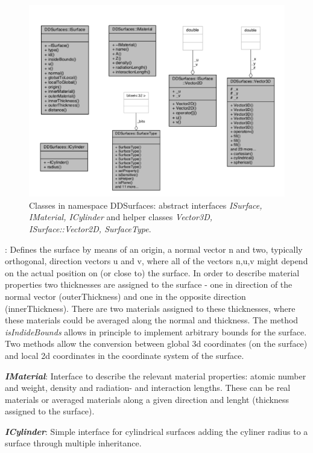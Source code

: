 \documentclass[10pt,a4paper]{article}
\begin{document}
\begin{figure}[h]
  \begin{center}
    \includegraphics[width=120mm] {DDRec_ISurface_classes.png}
    \caption{Classes in namespace DDSurfaces: abstract interfaces {\em ISurface, IMaterial, ICylinder}
      and helper classes {\em Vector3D, ISurface::Vector2D, SurfaceType}. }
    \label{fig:ddrec_ddsurfaces_classes}
  \end{center}
\end{figure}

: Defines the surface by means of an origin, a normal vector n and two, 
typically orthogonal, direction vectors u and v, where all of the vectors n,u,v might depend 
on the actual position on (or close to) the surface. In order to describe material properties
two thicknesses are assigned to the surface - one in direction of the normal vector (outerThickness) 
and one in the opposite direction (innerThickness). There are two materials assigned to these
thicknesses, where these materials could be averaged along the normal and thickness.
The method {\em isIndideBounds} allows in principle to implement arbitrary bounds for the surface.
Two methods allow the conversion between global 3d coordinates (on the surface) and local 2d coordinates 
in the coordinate system of the surface.
 
\noindent
{\em \bf IMaterial}: Interface to describe the relevant material properties: atomic number and weight, 
density and radiation- and interaction lengths. These can be real materials or averaged materials along
a given direction and lenght (thickness assigned to the surface).

\noindent
{\em \bf ICylinder}: Simple interface for cylindrical surfaces adding the cyliner radius to a surface
through multiple inheritance.
\end{document}
